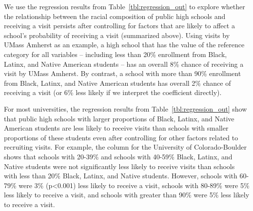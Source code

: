 \documentclass[twoside]{article}
\begin{document}
We use the regression results from Table~\ref{tbl:regression_out} to explore whether the relationship between the racial composition of public high schools and receiving a visit persists after controlling for factors that are likely to affect a school's probability of receiving a visit (summarized above). Using visits by UMass Amherst as an example, a high school that has the value of the reference category for all variables -- including less than 20\% enrollment from Black, Latinx, and Native American students -- has an overall 8\% chance of receiving a visit by UMass Amherst. By contrast, a school with more than 90\% enrollment from Black, Latinx, and Native American students has overall 2\% chance of receiving a visit (or 6\% less likely if we interpret the coefficient directly).

For most universities, the regression results from Table~\ref{tbl:regression_out} show that public high schools with larger proportions of Black, Latinx, and Native American students are less likely to receive visits than schools with smaller proportions of these students even after controlling for other factors related to recruiting visits. For example, the column for the University of Colorado-Boulder shows that schools with 20-39\% and schools with 40-59\% Black, Latinx, and Native students were not significantly less likely to receive visits than schools with less than 20\% Black, Latinx, and Native students.  However, schools with 60-79\% were 3\% (p<0.001) less likely to receive a visit, schools with 80-89\% were 5\% less likely to receive a visit, and schools with greater than 90\% were 5\% less likely to receive a visit.

\end{document}
